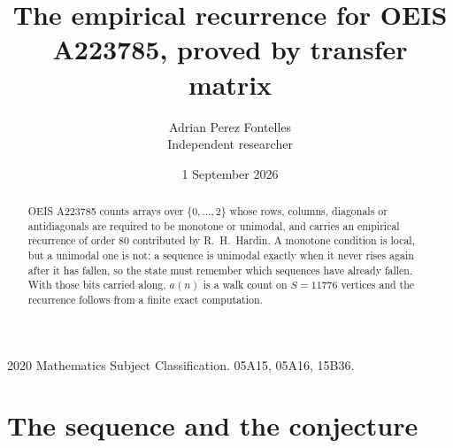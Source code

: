 \documentclass[11pt,a4paper]{article}
\title{The empirical recurrence for OEIS A223785, proved by transfer matrix}
\author{Adrian Perez Fontelles\\ \small Independent researcher}
\date{1 September 2026}
\theoremstyle{plain}
\theoremstyle{definition}
\begin{document}
\maketitle

\begin{abstract}
OEIS A223785 counts arrays over $\{0,\dots,2\}$ whose rows, columns, diagonals or
antidiagonals are required to be monotone or unimodal, and carries an empirical recurrence of
order $80$ contributed by R.~H.~Hardin. A monotone condition is local, but a unimodal one
is not: a sequence is unimodal exactly when it never rises again after it has fallen, so the
state must remember which sequences have already fallen. With those bits carried along, $a(n)$
is a walk count on $S=11776$ vertices and the recurrence follows from a finite exact
computation.
\end{abstract}

\noindent\small 2020 Mathematics Subject Classification. 05A15, 05A16, 15B36.\normalsize

\section{The sequence and the conjecture}
\end{document}
